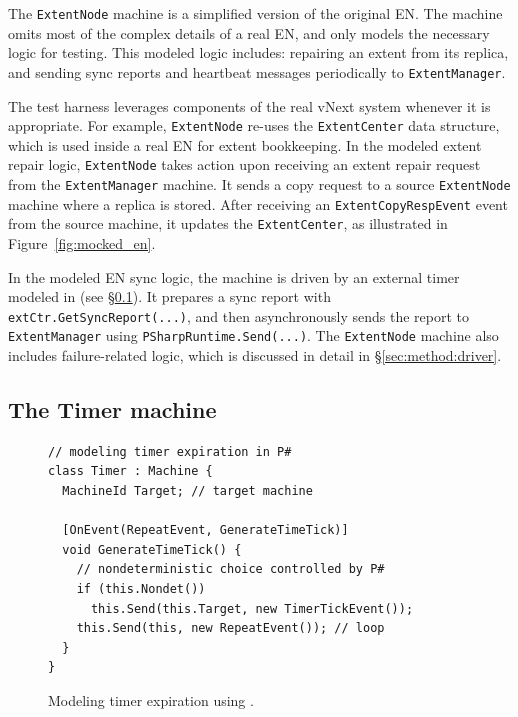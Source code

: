 The \texttt{ExtentNode} machine is a simplified version of the original EN. The machine omits most of the complex details of a real EN, and only models the necessary logic for testing. This modeled logic includes: repairing an extent from its replica, and sending sync reports and heartbeat messages periodically to \texttt{ExtentManager}. 

The \psharp test harness leverages components of the real vNext system whenever it is appropriate. For example, \texttt{ExtentNode} re-uses the \texttt{ExtentCenter} data structure, which is used inside a real EN for extent bookkeeping. In the modeled extent repair logic, \texttt{ExtentNode} takes action upon receiving an extent repair request from the \texttt{ExtentManager} machine. It sends a copy request to a source \texttt{ExtentNode} machine where a replica is stored. After receiving an \texttt{ExtentCopyRespEvent} event from the source machine, it updates the \texttt{ExtentCenter}, as illustrated in Figure~\ref{fig:mocked_en}. 

In the modeled EN sync logic, the machine is driven by an external timer modeled in \psharp (see \S\ref{sec:method:timer}). It prepares a sync report with \texttt{extCtr.GetSyncReport(...)}, and then asynchronously sends the report to \texttt{ExtentManager} using \texttt{PSharpRuntime.Send(...)}. The \texttt{ExtentNode} machine also includes failure-related logic, which is discussed in detail in \S\ref{sec:method:driver}.

\subsection{The Timer machine}
\label{sec:method:timer}

\begin{figure}[t]
\begin{lstlisting}
// modeling timer expiration in P#
class Timer : Machine {
  MachineId Target; // target machine

  [OnEvent(RepeatEvent, GenerateTimeTick)]
  void GenerateTimeTick() {
    // nondeterministic choice controlled by P#
    if (this.Nondet())
      this.Send(this.Target, new TimerTickEvent());
    this.Send(this, new RepeatEvent()); // loop
  }
}
\end{lstlisting}
\vspace{-4mm}
\caption{Modeling timer expiration using \psharp.}
\label{fig:mocked_timer}
\vspace{-2mm}
\end{figure}

